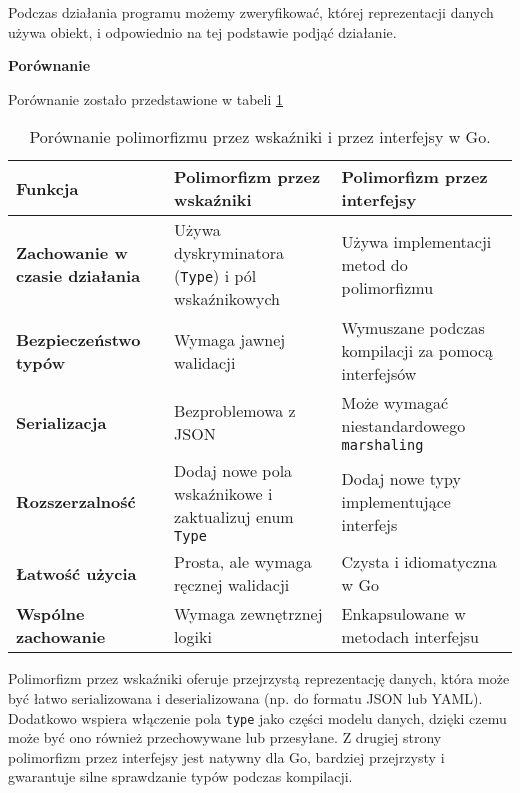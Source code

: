 Podczas działania programu możemy zweryfikować, której reprezentacji danych używa obiekt, i odpowiednio na tej podstawie podjąć działanie.

\textbf{Porównanie}

Porównanie zostało przedstawione w tabeli \ref{tab:431}

\begin{table}[h!]
\centering
\renewcommand{\arraystretch}{1.5} %
\begin{tabular}{|p{4cm}|p{5.5cm}|p{5.5cm}|}
\hline
\textbf{Funkcja}               & \textbf{Polimorfizm przez wskaźniki}                                   & \textbf{Polimorfizm przez interfejsy}                          \\ \hline
\textbf{Zachowanie w czasie działania} & Używa dyskryminatora (\texttt{Type}) i pól wskaźnikowych           & Używa implementacji metod do polimorfizmu                     \\ \hline
\textbf{Bezpieczeństwo typów}      & Wymaga jawnej walidacji                                              & Wymuszane podczas kompilacji za pomocą interfejsów            \\ \hline
\textbf{Serializacja}          & Bezproblemowa z JSON                                                 & Może wymagać niestandardowego \texttt{marshaling}             \\ \hline
\textbf{Rozszerzalność}        & Dodaj nowe pola wskaźnikowe i zaktualizuj enum \texttt{Type}          & Dodaj nowe typy implementujące interfejs                      \\ \hline
\textbf{Łatwość użycia}         & Prosta, ale wymaga ręcznej walidacji                                 & Czysta i idiomatyczna w Go                                    \\ \hline
\textbf{Wspólne zachowanie}    & Wymaga zewnętrznej logiki                                            & Enkapsulowane w metodach interfejsu                           \\ \hline
\end{tabular}
\caption{Porównanie polimorfizmu przez wskaźniki i przez interfejsy w Go.}\label{tab:431}
\end{table}

Polimorfizm przez wskaźniki oferuje przejrzystą reprezentację danych, która może być łatwo serializowana i deserializowana (np. do formatu JSON lub YAML). Dodatkowo wspiera włączenie pola \texttt{type} jako części modelu danych, dzięki czemu może być ono również przechowywane lub przesyłane. Z drugiej strony polimorfizm przez interfejsy jest natywny dla Go, bardziej przejrzysty i gwarantuje silne sprawdzanie typów podczas kompilacji.

